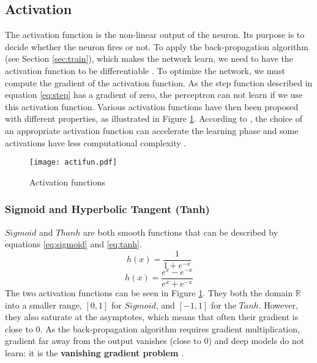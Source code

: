 \subsection{Activation} \label{subs:acti}
The activation function is the non-linear output of the neuron. Its purpose is to decide whether the neuron fires or not. To apply the back-propagation algorithm (see Section \ref{sec:train}), which makes the network learn, we need to have the activation function to be differentiable \cite{lecun_backpropagation_1989}. To optimize the network, we must compute the gradient of the activation function. As the step function described in equation \eqref{eq:step} has a gradient of zero, the perceptron can not learn if we use this activation function. Various activation functions have then been proposed with different properties, as illustrated in Figure \ref{fig:acti}. According to \textcite{khan_survey_2020}, the choice of an appropriate activation function can accelerate the learning phase and some activations have less computational complexity \cite{krizhevsky_imagenet_2012}.
%
\begin{figure}
    \centering
    \texttt{[image: actifun.pdf]}
    \caption{Activation functions}
    \label{fig:acti}
\end{figure}
%
\subsubsection{Sigmoid and Hyperbolic Tangent (Tanh)}
$Sigmoid$ and $Thanh$ are both smooth functions that can be described by equations \eqref{eq:sigmoid} and \eqref{eq:tanh}.
%
\begin{equation}
    h(x) = \frac{1}{1 + e^{-x}}
    \label{eq:sigmoid}
\end{equation}
%
\begin{equation}
    h(x) = \frac{e^{x} - e^{-x}}{e^{x} + e^{-x}}
    \label{eq:tanh}
\end{equation}
%
The two activation functions can be seen in Figure \ref{fig:acti}. They both  the domain $\mathbb{R}$ into a smaller range, $[0, 1]$ for $Sigmoid$, and $[-1, 1]$ for the $Tanh$. However, they also saturate at the asymptotes, which means that often their gradient is close to 0. As the back-propagation algorithm requires gradient multiplication, gradient far away from the output vanishes (close to 0) and deep models do not learn: it is the \textbf{vanishing gradient problem} \cite{goodfellow_deep_2016}.
%
